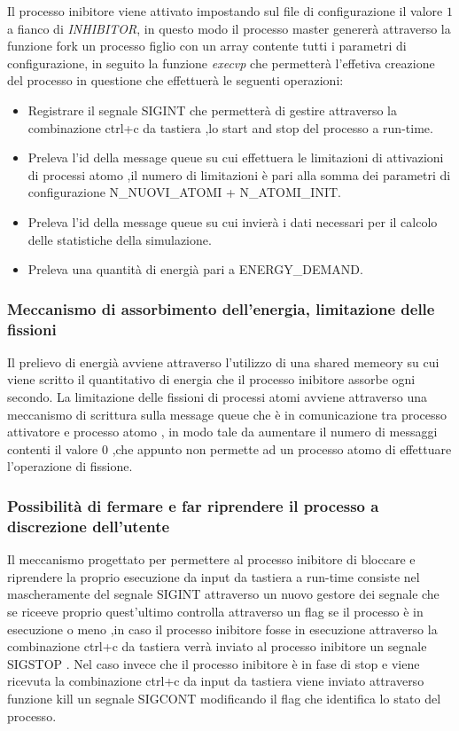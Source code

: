 Il processo inibitore viene attivato impostando sul file di configurazione il valore $1$
 a fianco di \textit{INHIBITOR}, in questo modo il processo master
genererà attraverso la funzione fork un processo figlio con un array contente tutti
 i parametri di configurazione, in seguito la funzione
  \textit{execvp} che permetterà l'effetiva creazione del processo in questione che effettuerà le 
  seguenti operazioni: 
\begin{itemize}
    \item Registrare il segnale SIGINT che permetterà di gestire attraverso la combinazione ctrl+c da tastiera ,lo start and stop del processo a run-time.
    \item Preleva l'id della message queue su cui effettuera le limitazioni di attivazioni di processi atomo ,il numero di limitazioni è pari alla somma dei parametri di configurazione N\_NUOVI\_ATOMI + N\_ATOMI\_INIT. 
    \item Preleva l'id della message queue su cui invierà i dati necessari per il calcolo delle statistiche della simulazione. 
    \item Preleva una quantità di energià pari a ENERGY\_DEMAND.
\end{itemize}
\subsubsection{Meccanismo di assorbimento dell'energia, limitazione delle fissioni}
Il prelievo di energià avviene attraverso l'utilizzo di una shared memeory su cui viene scritto il quantitativo di energia che il processo inibitore assorbe ogni secondo. 
\newline
La limitazione delle fissioni di processi atomi avviene attraverso una meccanismo di scrittura sulla message queue che è in comunicazione tra processo attivatore e processo atomo , in modo tale da aumentare il numero di messaggi contenti il valore 0 ,che appunto non permette ad un processo atomo di effettuare l'operazione di fissione. 
\subsubsection{Possibilità di fermare e far riprendere il processo a discrezione dell'utente}
Il meccanismo progettato per permettere al processo inibitore di bloccare e riprendere la proprio esecuzione da input da tastiera a run-time consiste nel mascheramente del segnale SIGINT attraverso un nuovo gestore dei segnale che se riceeve proprio quest'ultimo controlla attraverso un flag se il processo è in esecuzione o meno ,in caso il processo inibitore fosse in esecuzione attraverso la combinazione ctrl+c da tastiera verrà inviato al processo inibitore un segnale SIGSTOP .
Nel caso invece che il processo inibitore è in fase di stop e viene ricevuta la combinazione ctrl+c da input da tastiera viene inviato attraverso funzione kill un segnale SIGCONT modificando il flag che identifica lo stato del processo. 
